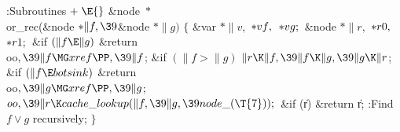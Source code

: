 \Y\B\4:Subroutines\X${}\mathrel+\E{}$\6
\&{node} ${}{*}{}$\\{or\_rec}(\&{node} ${}{*}\|f,\39{}$\&{node} ${}{*}\|g){}$\1%
\1\2\2\6
${}\{{}$\1\6
\&{var} ${}{*}\|v,{}$ ${}{*}\\{vf},{}$ ${}{*}\\{vg};{}$\6
\&{node} ${}{*}\|r,{}$ ${}{*}\\{r0},{}$ ${}{*}\\{r1};{}$\7
\&{if} ${}(\|f\E\|g){}$\1\5
\&{return} \\{oo}${},\39\|f\MG\\{xref}\PP,\39\|f{}$;\2\6
\&{if} ${}(\|f>\|g){}$\1\5
${}\|r\K\|f,\39\|f\K\|g,\39\|g\K\|r{}$;\2\6
\&{if} ${}(\|f\E\\{botsink}){}$\1\5
\&{return} \\{oo}${},\39\|g\MG\\{xref}\PP,\39\|g{}$;\2\6
${}\\{oo},\39\|r\K\\{cache\_lookup}(\|f,\39\|g,\39\\{node\_}(\T{7}));{}$\6
\&{if} (\|r)\1\5
\&{return} \|r;\2\6
:Find $f\lor g$ recursively\X;\6
\4${}\}{}$\2\par
\fi

